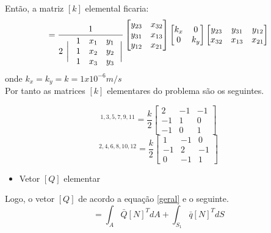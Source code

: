 \documentclass{article} %
\begin{document}
Então, a matriz \([k]\) elemental ficaria:
\begin{equation}
[k]=\frac{1}{2\hspace{4pt}\biggr|\color{white}\begin{bmatrix}\color{black}
	1&\color{black}x_1&\color{black}y_1\\\color{black}1&\color{black}x_2&\color{black}y_2\\\color{black}1&\color{black}x_3&\color{black}y_3
	\color{white}\end{bmatrix}\color{black}\biggr|}\begin{bmatrix}
y_{23}&x_{32}\\y_{31}&x_{13}\\y_{12}&x_{21}
\end{bmatrix}\begin{bmatrix}
k_x&0\\0&k_y
\end{bmatrix}\begin{bmatrix}
y_{23}&y_{31}&y_{12}\\x_{32}&x_{13}&x_{21}
\end{bmatrix}
\end{equation}
onde \(k_x=k_y=k=1x10^{-6}m/s\)\\
Por tanto as matrices \([k]\) elementares do problema são os seguintes.


\begin{equation}
[k]^{1,3,5,7,9,11}=\frac{k}{2}\begin{bmatrix}
2&-1&-1\\-1&1&0\\-1&0&1
\end{bmatrix}
\end{equation}
\begin{equation}
[k]^{2,4,6,8,10,12}=\frac{k}{2}\begin{bmatrix}
1&-1&0\\-1&2&-1\\0&-1&1
\end{bmatrix}
\end{equation}


\begin{itemize}
	\item Vetor \([Q]\)	elementar
\end{itemize}


Logo, o vetor \([Q]\) de acordo a equação \ref{geral} e o seguinte.
\begin{equation*}
[{Q}]=\int_{A}\bar{Q}[N]^TdA+\int_{S_1}\bar{q}[N]^TdS
\end{equation*}
\end{document}
